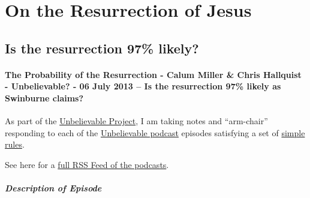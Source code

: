 \chapter{On the Resurrection of Jesus}\label{ch:resurrection}

\section{Is the resurrection 97\% likely?}

\subsubsection{The Probability of the Resurrection - Calum Miller \&
Chris Hallquist - Unbelievable? - 06 July 2013 -- Is the resurrection
97\% likely as Swinburne
claims?}\label{theprobabilityoftheresurrection-calummillerchrishallquist-unbelievable-06july2013--istheresurrection97likleyasswinburneclaims}

As part of the
\href{http://brianblais.wordpress.com/2013/02/27/unbelievable-project-a-non-believers-armchair-perspective-on-six-years-of-christian-debates/}{Unbelievable
Project}, I am taking notes and ``arm-chair'' responding to each of the
\href{http://www.premierradio.org.uk/shows/saturday/unbelievable.aspx}{Unbelievable
podcast} episodes satisfying a set of
\href{http://brianblais.wordpress.com/2013/02/27/unbelievable-project-a-non-believers-armchair-perspective-on-six-years-of-christian-debates/}{simple
rules}.

See here for a
\href{http://ondemand.premier.org.uk/unbelievable/AudioFeed.aspx}{full
RSS Feed of the podcasts}.

\paragraph{Description of Episode}\label{descriptionofepisode}

